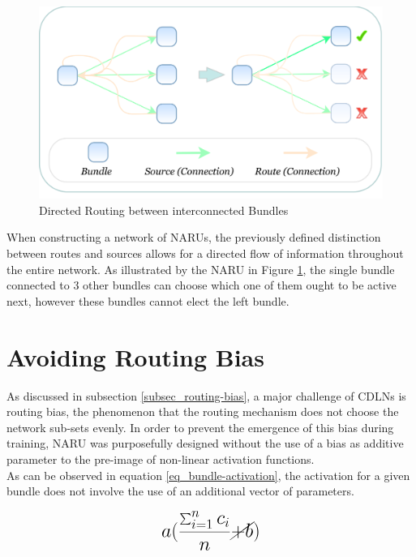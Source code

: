 \begin{figure}[h]
    \centering 
     \includegraphics[width=\textwidth]{PICs/NARU/directed-routing.png}
    \caption{Directed Routing between interconnected Bundles}
    \label{directed-routing-illustration}
\end{figure}

When constructing a network of \acp{NARU}, the previously defined distinction between routes and sources allows for a directed flow of information
throughout the entire network. As illustrated by the \acs{NARU} in Figure \ref{directed-routing-illustration},
the single bundle connected to 3 other bundles can choose which
one of them ought to be active next, however these bundles cannot 
elect the left bundle.

\clearpage


\section{Avoiding Routing Bias}

As discussed in subsection \ref{subsec_routing-bias}, a major challenge of
\acp{CDLN} is routing bias, the phenomenon that the routing mechanism
does not choose the network sub-sets evenly.
In order to prevent the emergence of this bias during training,
\acs{NARU} was purposefully designed without the use of a bias
as additive parameter to the pre-image of non-linear activation 
functions.  \\
As can be observed in equation \ref{eq_bundle-activation}, the activation 
for a given bundle does not involve the use of an additional vector of parameters.

\begin{gather} 
\mbox{\LARGE$\displaystyle
 a( \frac{\sum_{i=1}^{n} c_i}{n} \cancel{ + b} )  
$}
\end{gather}

